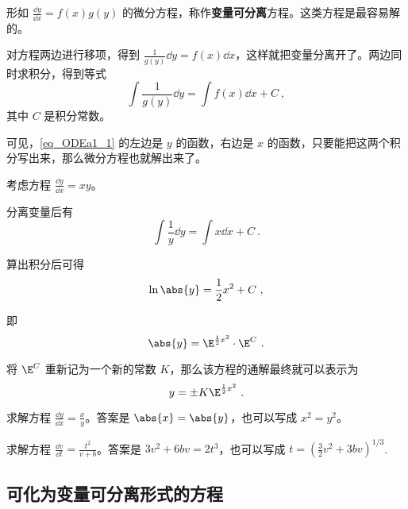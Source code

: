 

形如 $\frac{\dd y}{\dd x}=f(x)g(y)$ 的微分方程，称作\textbf{变量可分离}方程。这类方程是最容易解的。

对方程两边进行移项，得到 $\frac{1}{g(y)}\dd y=f(x)\dd x$，这样就把变量分离开了。两边同时求积分，得到等式
\begin{equation}\label{eq_ODEa1_1}
\int\frac{1}{g(y)}\dd y=\int f(x)\dd x+C~,
\end{equation}
其中 $C$ 是积分常数。

可见，\autoref{eq_ODEa1_1} 的左边是 $y$ 的函数，右边是 $x$ 的函数，只要能把这两个积分写出来，那么微分方程也就解出来了。

\begin{example}{}
考虑方程 $\frac{\dd y}{\dd x}=xy$。

分离变量后有
\begin{equation}
\int\frac{1}{y}\dd y=\int x\dd x+C~.
\end{equation}

算出积分后可得
\begin{equation}
\ln\abs{y}=\frac{1}{2}x^2+C~,
\end{equation}

即
\begin{equation}
\abs{y}=\E^{\frac{1}{2}x^2}\cdot\E^C~.
\end{equation}

将 $\E^C$ 重新记为一个新的常数 $K$，那么该方程的通解最终就可以表示为
\begin{equation}
y=\pm K\E^{\frac{1}{2}x^2}~.
\end{equation}
\end{example}

\begin{exercise}{}
求解方程 $\frac{\dd y}{\dd x}=\frac{x}{y}$。答案是 $\abs{x}=\abs{y}$，也可以写成 $x^2=y^2$。
\end{exercise}

\begin{exercise}{}
求解方程 $\frac{\dd v}{\dd t}=\frac{t^2}{v+b}$。答案是 $3v^2+6bv=2t^3$，也可以写成 $t=(\frac{3}{2}v^2+3bv)^{1/3}$.
\end{exercise}

\subsection{可化为变量可分离形式的方程}

